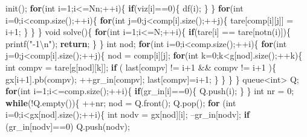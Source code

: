 \documentclass[10pt,]{article}
\newenvironment{Shaded}{}{}
\newcommand{\KeywordTok}[1]{\textcolor[rgb]{0.00,0.44,0.13}{\textbf{{#1}}}}
\newcommand{\DataTypeTok}[1]{\textcolor[rgb]{0.56,0.13,0.00}{{#1}}}
\newcommand{\DecValTok}[1]{\textcolor[rgb]{0.25,0.63,0.44}{{#1}}}
\newcommand{\CharTok}[1]{\textcolor[rgb]{0.25,0.44,0.63}{{#1}}}
\newcommand{\StringTok}[1]{\textcolor[rgb]{0.25,0.44,0.63}{{#1}}}
\newcommand{\NormalTok}[1]{{#1}}
\begin{document}
\begin{Shaded}
\begin{Highlighting}[]
  \NormalTok{init();}
  \KeywordTok{for}\NormalTok{(}\DataTypeTok{int} \NormalTok{i=}\DecValTok{1}\NormalTok{;i<=Nn;++i)\{}
    \KeywordTok{if}\NormalTok{(viz[i]==}\DecValTok{0}\NormalTok{)\{}
      \NormalTok{df(i);}
    \NormalTok{\}}
  \NormalTok{\}}
  \KeywordTok{for}\NormalTok{(}\DataTypeTok{int} \NormalTok{i=}\DecValTok{0}\NormalTok{;i<comp.size();++i)\{}
    \KeywordTok{for}\NormalTok{(}\DataTypeTok{int} \NormalTok{j=}\DecValTok{0}\NormalTok{;j<comp[i].size();++j)\{}
      \NormalTok{tare[comp[i][j]] = i}\DecValTok{+1}\NormalTok{;}
    \NormalTok{\}}
  \NormalTok{\}}
\NormalTok{\}}
\DataTypeTok{void} \NormalTok{solve()\{}
  \KeywordTok{for}\NormalTok{(}\DataTypeTok{int} \NormalTok{i=}\DecValTok{1}\NormalTok{;i<=N;++i)\{}
    \KeywordTok{if}\NormalTok{(tare[i] == tare[notn(i)])\{}
      \NormalTok{printf(}\StringTok{"-1}\CharTok{\textbackslash{}n}\StringTok{"}\NormalTok{);}
      \KeywordTok{return}\NormalTok{;}
    \NormalTok{\}}
  \NormalTok{\}}
  \DataTypeTok{int} \NormalTok{nod;}
  \KeywordTok{for}\NormalTok{(}\DataTypeTok{int} \NormalTok{i=}\DecValTok{0}\NormalTok{;i<comp.size();++i)\{}
    \KeywordTok{for}\NormalTok{(}\DataTypeTok{int} \NormalTok{j=}\DecValTok{0}\NormalTok{;j<comp[i].size();++j)\{}
      \NormalTok{nod = comp[i][j];}
      \KeywordTok{for}\NormalTok{(}\DataTypeTok{int} \NormalTok{k=}\DecValTok{0}\NormalTok{;k<g[nod].size();++k)\{}
        \DataTypeTok{int} \NormalTok{compv = tare[g[nod][k]];}
        \KeywordTok{if} \NormalTok{( last[compv] != i}\DecValTok{+1} \NormalTok{&& compv != i}\DecValTok{+1} \NormalTok{)\{}
          \NormalTok{gx[i}\DecValTok{+1}\NormalTok{].pb(compv);}
          \NormalTok{++gr_in[compv];}
          \NormalTok{last[compv]=i}\DecValTok{+1}\NormalTok{;}
        \NormalTok{\}}
      \NormalTok{\}}
    \NormalTok{\}}
  \NormalTok{\}}
  \NormalTok{queue<}\DataTypeTok{int}\NormalTok{> Q;}
  \KeywordTok{for}\NormalTok{(}\DataTypeTok{int} \NormalTok{i=}\DecValTok{1}\NormalTok{;i<=comp.size();++i)\{}
    \KeywordTok{if}\NormalTok{(gr_in[i]==}\DecValTok{0}\NormalTok{)\{}
      \NormalTok{Q.push(i);}
    \NormalTok{\}}
  \NormalTok{\}}
  \DataTypeTok{int} \NormalTok{nr = }\DecValTok{0}\NormalTok{;}
  \KeywordTok{while}\NormalTok{(!Q.empty())\{}
    \NormalTok{++nr;}
    \NormalTok{nod = Q.front(); Q.pop();}
    \KeywordTok{for} \NormalTok{(}\DataTypeTok{int} \NormalTok{i=}\DecValTok{0}\NormalTok{;i<gx[nod].size();++i)\{}
      \DataTypeTok{int} \NormalTok{nodv = gx[nod][i];}
      \NormalTok{--gr_in[nodv];}
      \KeywordTok{if} \NormalTok{(gr_in[nodv]==}\DecValTok{0}\NormalTok{)}
        \NormalTok{Q.push(nodv);}

\end{Highlighting}
\end{Shaded}
\end{document}

